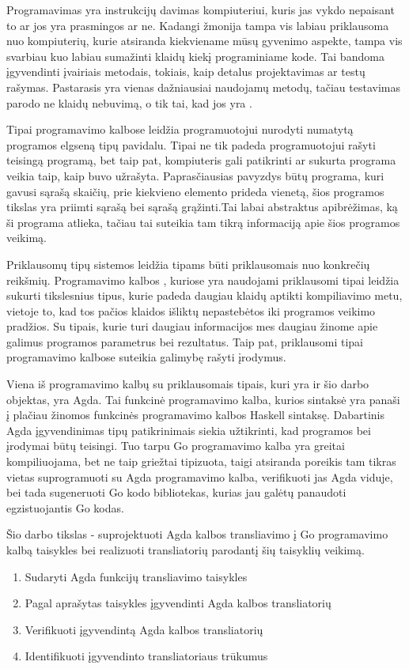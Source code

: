 \documentclass{VUMIFPSkursinis}
\begin{document}
\tableofcontents


Programavimas yra instrukcijų davimas kompiuteriui, kuris jas vykdo nepaisant to ar jos yra prasmingos ar ne. Kadangi žmonija tampa vis labiau priklausoma nuo kompiuterių, kurie atsiranda kiekviename mūsų gyvenimo aspekte, tampa vis svarbiau kuo labiau sumažinti klaidų kiekį programiniame kode. Tai bandoma įgyvendinti įvairiais metodais, tokiais, kaip detalus projektavimas ar testų rašymas. Pastarasis yra vienas dažniausiai naudojamų metodų, tačiau testavimas parodo ne klaidų nebuvimą, o tik tai, kad jos yra \cite{UHC}.
\par Tipai programavimo kalbose leidžia programuotojui nurodyti numatytą programos elgseną tipų pavidalu. Tipai ne tik padeda programuotojui rašyti teisingą programą, bet taip pat, kompiuteris gali patikrinti ar sukurta programa veikia taip, kaip buvo užrašyta. Paprasčiausias pavyzdys būtų programa, kuri gavusi sąrašą skaičių, prie kiekvieno elemento prideda vienetą, šios programos tikslas yra priimti sąrašą bei sąrašą grąžinti.Tai labai abstraktus apibrėžimas, ką ši programa atlieka, tačiau tai suteikia tam tikrą informaciją apie šios programos veikimą.\par
Priklausomų tipų sistemos \cite{schematicApproach} leidžia tipams būti priklausomais nuo konkrečių reikšmių. Programavimo kalbos \cite{agda_book,idris}, kuriose yra naudojami priklausomi tipai leidžia sukurti tikslesnius tipus, kurie padeda daugiau klaidų aptikti kompiliavimo metu, vietoje to, kad tos pačios klaidos išliktų nepastebėtos iki programos veikimo pradžios. Su tipais, kurie turi daugiau informacijos mes daugiau žinome apie galimus programos parametrus bei rezultatus. Taip pat, priklausomi tipai programavimo kalbose suteikia galimybę rašyti įrodymus.
\par Viena iš programavimo kalbų su priklausomais tipais, kuri yra ir šio darbo objektas, yra Agda. Tai funkcinė programavimo kalba, kurios sintaksė yra panaši į plačiau žinomos funkcinės programavimo kalbos Haskell \cite{haskell} sintaksę. Dabartinis Agda įgyvendinimas tipų patikrinimais siekia užtikrinti, kad programos bei įrodymai būtų teisingi. Tuo tarpu Go programavimo kalba \cite{Go} yra greitai kompiliuojama, bet ne taip griežtai tipizuota, taigi atsiranda poreikis tam tikras vietas suprogramuoti su Agda programavimo kalba, verifikuoti jas Agda viduje, bei tada sugeneruoti Go kodo bibliotekas, kurias jau galėtų panaudoti egzistuojantis Go kodas.\par Šio darbo tikslas - suprojektuoti Agda kalbos transliavimo į Go programavimo kalbą taisykles bei realizuoti transliatorių parodantį šių taisyklių veikimą.
\begin{enumerate}[noitemsep]
	\item Sudaryti Agda funkcijų transliavimo taisykles
	\item Pagal aprašytas taisykles įgyvendinti Agda kalbos transliatorių
	\item Verifikuoti įgyvendintą Agda kalbos transliatorių
	\item Identifikuoti įgyvendinto transliatoriaus trūkumus 
\end{enumerate}
\end{document}
